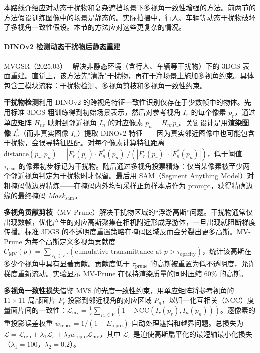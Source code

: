 本路线介绍应对动态干扰物和复杂遮挡场景下多视角一致性增强的方法。前两节的方法假设训练图像中的场景是静态的。实际拍摄中，行人、车辆等动态干扰物破坏了多视角一致性假设。本节的方法应对这些更复杂的情况。

\paragraph{DINOv2 检测动态干扰物后静态重建}

MVGSR（2025.03）~\cite{2503_08093} 解决非静态环境（含行人、车辆等干扰物）下的 3DGS 表面重建。直觉上，该方法先"清洗"干扰物，再在干净场景上施加多视角约束。具体包含三模块流程：干扰物检测、多视角剪枝和多视角一致性约束。

\textbf{干扰物检测}利用 DINOv2 的跨视角特征一致性识别仅存在于少数帧中的物体。先用标准 3DGS 粗训练得到初始场景表示，然后对参考视角 $I_r$ 的每个像素 $p_r$，通过单应矩阵 $H_{nr}$ 映射到邻近视角 $I_n$ 的对应像素 $p_n = H_{nr} p_r$。关键设计是用\textbf{渲染图像} $I^*_n$（而非真实图像 $I_n$）提取 DINOv2 特征——因为真实邻近图像中也可能包含干扰物，会误导特征匹配。对每个像素计算特征距离 $\text{distance}(p_r, p_n) = |F_r(p_r) \cdot F^*_n(p_n)| / (|F_r(p_r)| \cdot |F^*_n(p_n)|)$，低于阈值 $\tau_{\text{near}}$ 的像素初步标记为干扰物。随后通过多视角投票精炼：仅当某像素被至少两个邻近视角判定为干扰物时才保留。最后用 SAM（Segment Anything Model）对粗掩码做边界精炼——在掩码内外均匀采样正负样本点作为 prompt，获得精确边缘的最终掩码 $Mask_{\text{sam}}$。

\textbf{多视角贡献剪枝}（MV-Prune）解决干扰物区域的“浮游高斯”问题。干扰物通常仅出现数帧，优化产生的对应高斯聚集在相机附近形成浮游体，一旦出现就阻断梯度传播。标准 3DGS 的不透明度重置策略在掩码区域反而会分裂出更多高斯。MV-Prune 为每个高斯定义多视角贡献度 $C_{\text{MV}}(p) = \sum_{V_k \in V} \mathbb{I}(\text{cumulative transmittance at } p > \tau_{\text{opacity}})$，统计该高斯在多少个视角中具有显著贡献。贡献度低于 $\tau_{\text{prune}}$ 的高斯被重置为低不透明度，允许梯度重新流动。实验显示 MV-Prune 在保持渲染质量的同时压缩 60\% 的高斯。

\textbf{多视角一致性损失}借鉴 MVS 的光度一致性约束，用单应矩阵将参考视角的 $11 \times 11$ 局部面片 $P_r$ 投影到邻近视角的对应区域 $P_n$，以归一化互相关（NCC）度量面片间的一致性：$\mathcal{L}_{\text{mv}} = \frac{1}{V}\sum_{p_r \in V}(1 - \text{NCC}(I_r(p_r), I_n(p_n)))$。逐像素的重投影误差权重 $w_{\text{repro}} = 1/(1 + E_{\text{repro}})$ 自动处理遮挡和越界问题。总损失为 $\mathcal{L} = \mathcal{L}_{\text{rgb}} + \lambda_1 \mathcal{L}_s + \lambda_2 w_{\text{repro}} \mathcal{L}_{\text{mv}}$，其中 $\mathcal{L}_s$ 是迫使高斯扁平化的最短轴最小化损失（$\lambda_1 = 100$，$\lambda_2 = 0.2$）。

